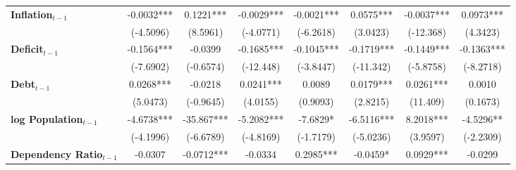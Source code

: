 \begin{center}
\begin{tabular}{lccccccc}
\textbf{Inflation$_{t-1}$}      &      -0.0032***      &          0.1221***          &          -0.0029***          &              -0.0021***             &            0.0575***             &          -0.0037***         &           0.0973***            \\
\textbf{ }                         &      (-4.5096)       &           (8.5961)          &          (-4.0771)           &              (-6.2618)              &             (3.0423)             &          (-12.368)          &            (4.3423)            \\
\textbf{Deficit$_{t-1}$}             &      -0.1564***      &           -0.0399           &          -0.1685***          &              -0.1045***             &            -0.1719***            &          -0.1449***         &           -0.1363***           \\
\textbf{ }                         &      (-7.6902)       &          (-0.6574)          &          (-12.448)           &              (-3.8447)              &            (-11.342)             &          (-5.8758)          &           (-8.2718)            \\
\textbf{Debt$_{t-1}$}                &      0.0268***       &           -0.0218           &          0.0241***           &                0.0089               &            0.0179***             &          0.0261***          &             0.0010             \\
\textbf{ }                         &       (5.0473)       &          (-0.9645)          &           (4.0155)           &               (0.9093)              &             (2.8215)             &           (11.409)          &            (0.1673)            \\
\textbf{log Population$_{t-1}$}      &      -4.6738***      &          -35.867***         &          -5.2082***          &               -7.6829*              &            -6.5116***            &          8.2018***          &           -4.5296**            \\
\textbf{ }                         &      (-4.1996)       &          (-6.6789)          &          (-4.8169)           &              (-1.7179)              &            (-5.0236)             &           (3.9597)          &           (-2.2309)            \\
\textbf{Dependency Ratio$_{t-1}$}   &       -0.0307        &          -0.0712***         &           -0.0334            &              0.2985***              &             -0.0459*             &          0.0929***          &            -0.0299             \\

\end{tabular}
\end{center}
